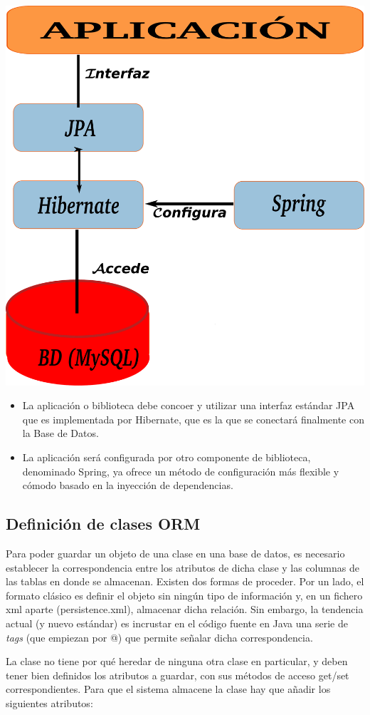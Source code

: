 \documentclass[11pt]{article}
\begin{document}
\begin{center}
\includegraphics[width=.6\textwidth]{esquemahibernate.pdf}
\end{center}

\begin{itemize}

\item La aplicación o biblioteca debe concoer y utilizar una interfaz estándar JPA que es implementada por Hibernate, que es la que se conectará finalmente con la Base de Datos.

\item La aplicación será configurada por otro componente de biblioteca, denominado Spring, ya ofrece un método de configuración más flexible y cómodo basado en la inyección de dependencias.

\end{itemize}


\subsection{Definición de clases ORM} \label{sec-6-2}

Para poder guardar un objeto de una clase en una base de datos, es necesario establecer la
correspondencia entre los atributos de dicha clase y las columnas de las tablas
en donde se almacenan. Existen dos formas de proceder. Por un lado, el formato
clásico es definir el objeto sin ningún tipo de información y, en un fichero xml
aparte (persistence.xml), almacenar dicha relación. Sin embargo, la tendencia
actual (y nuevo estándar) es incrustar en el código fuente en Java una serie de \emph{tags} (que empiezan por @) que permite señalar dicha correspondencia.

La clase no tiene por qué heredar de ninguna otra clase en particular, y deben tener bien definidos los
atributos a guardar, con sus métodos de acceso get/set correspondientes. Para que el sistema almacene la clase hay que añadir los siguientes atributos:
\end{document}
